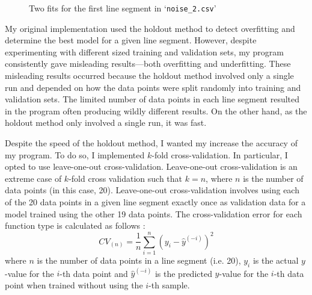 \documentclass[onecolumn, 12pt, a4paper]{article}
\begin{document}
\begin{figure}[htbp]
    \centering
    \hfill
    \caption{Two fits for the first line segment in `\texttt{noise\_2.csv}'}
    \label{fig:noise_2.csv}
\end{figure}

My original implementation used the holdout method
to detect overfitting and determine the best model for a given line segment.
However, despite experimenting with different
sized training and validation sets, my program consistently gave
misleading results---both overfitting and underfitting.
These misleading results occurred because the holdout method involved only a single run 
and depended on how the data points were split randomly into training and validation sets.
The limited number of data points in each line segment resulted 
in the program often producing wildly different results.
On the other hand, as the holdout method only involved a single run, it was fast.

Despite the speed of the holdout method, I wanted my increase the accuracy
of my program.
To do so, I implemented $k$-fold cross-validation.
In particular, I opted to use leave-one-out cross-validation.
Leave-one-out cross-validation is 
an extreme case of $k$-fold cross validation
such that $k = n$, where
$n$ is the number of data points (in this case, 20).
Leave-one-out cross-validation involves using each of
the 20 data points in a given line segment exactly once as validation data for a model
trained using the other 19 data points. 
The cross-validation error for each function type is calculated
as follows \cite{Stanford}:
\[
    CV_{(n)} = \frac{1}{n} \sum_{i = 1}^{n} (y_{i} - \hat{y}^{(-i)})^{2}
\]
where
$n$ is the number of data points in a line segment (i.e. 20),
$y_{i}$ is the actual $y$-value for the $i$-th data point
and $\hat{y}^{(-i)}$ is the predicted $y$-value for the $i$-th
data point when trained without using the $i$-th sample.
\end{document}
